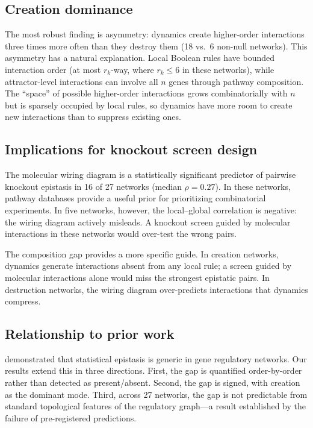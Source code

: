 \documentclass[10pt]{article}
\begin{document}
\subsection{Creation dominance}

The most robust finding is asymmetry: dynamics create higher-order
interactions three times more often than they destroy them (18 vs.\ 6
non-null networks). This asymmetry has a natural explanation. Local
Boolean rules have bounded interaction order (at most $r_k$-way,
where $r_k \leq 6$ in these networks), while attractor-level
interactions can involve all $n$ genes through pathway composition.
The ``space'' of possible higher-order interactions grows
combinatorially with $n$ but is sparsely occupied by local rules,
so dynamics have more room to create new interactions than to
suppress existing ones.

\subsection{Implications for knockout screen design}

The molecular wiring diagram is a statistically significant predictor
of pairwise knockout epistasis in 16 of 27 networks (median
$\rho = 0.27$). In these networks, pathway databases provide a
useful prior for prioritizing combinatorial experiments. In five
networks, however, the local--global correlation is negative: the
wiring diagram actively misleads. A knockout screen guided by
molecular interactions in these networks would over-test the
wrong pairs.

The composition gap provides a more specific guide. In creation
networks, dynamics generate interactions absent from any local rule;
a screen guided by molecular interactions alone would miss the
strongest epistatic pairs. In destruction networks, the wiring diagram
over-predicts interactions that dynamics compress.

\subsection{Relationship to prior work}

\citet{gjuvsland2007statistical} demonstrated that
statistical epistasis is generic in gene regulatory networks. Our
results extend this in three directions. First, the gap is quantified
order-by-order rather than detected as present/absent. Second, the
gap is signed, with creation as the dominant mode. Third, across 27
networks, the gap is not predictable from standard topological
features of the regulatory graph---a result established by the
failure of pre-registered predictions.
\end{document}
